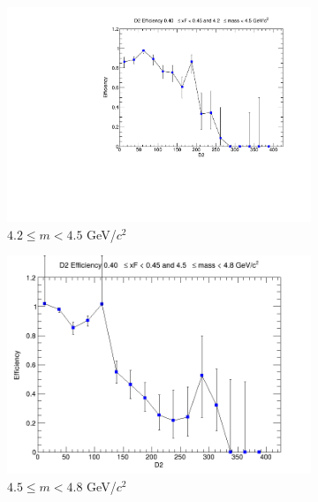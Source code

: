 \begin{figure}[p]
    \centering
    \begin{subfigure}[b]{0.32\textwidth}
        \centering
        \includegraphics[width=\textwidth]{./kTrackerEfficiencyPlots/D2_Efficiency_xF8_mass0.pdf}
        \caption{$4.2 \leq m < 4.5$ GeV/$c^2$}
        \label{fig:xF8_mass0}
    \end{subfigure}
    \hfill
    \begin{subfigure}[b]{0.32\textwidth}
        \centering
        \includegraphics[width=\textwidth]{./kTrackerEfficiencyPlots/D2_Efficiency_xF8_mass1.png}
        \caption{$4.5 \leq m < 4.8$ GeV/$c^2$}
        \label{fig:xF8_mass1}
    \end{subfigure}
    \hfill
    \begin{subfigure}[b]{0.32\textwidth}

\end{subfigure}
\end{figure}
